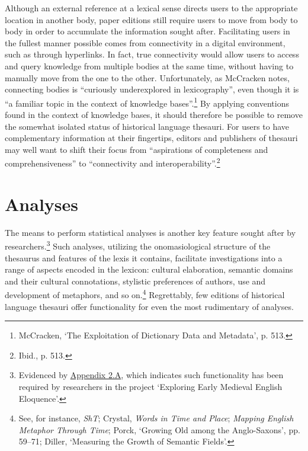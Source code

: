 Although an external reference at a lexical sense directs users to the appropriate location in another body, paper editions still require users to move from body to body in order to accumulate the information sought after. Facilitating users in the fullest manner possible comes from connectivity in a digital environment, such as through hyperlinks. In fact, true connectivity would allow users to access and query knowledge from multiple bodies at the same time, without having to manually move from the one to the other. Unfortunately, as McCracken notes, connecting bodies is ``curiously underexplored in lexicography'', even though it is ``a familiar topic in the context of knowledge bases''.\footnote{McCracken, `The Exploitation of Dictionary Data and Metadata', %
p. 513.} By applying conventions found in the context of knowledge bases, it should therefore be possible to remove the somewhat isolated status of historical language thesauri. For users to have complementary information at their fingertips, editors and publishers of thesauri may well want to shift their focus from ``aspirations of completeness and comprehensiveness'' to ``connectivity and interoperability''.\footnote{Ibid., p. 513.}



\section{Analyses}
\label{sect:Stolk_thes-functionality:analyses}

The means to perform statistical analyses is another key feature sought after by researchers.\footnote{Evidenced by \hyperref[Appendix2.A]{Appendix 2.A}, which indicates such functionality has been required by researchers in the project `Exploring Early Medieval English Eloquence'.} Such analyses, utilizing the onomasiological structure of the thesaurus and features of the lexis it contains, facilitate investigations into a range of aspects encoded in the lexicon: cultural elaboration, semantic domains and their cultural connotations, stylistic preferences of authors, use and development of metaphors, and so on.\footnote{See, for instance, \textit{ShT}; Crystal, \textit{Words in Time and Place}; \textit{Mapping English Metaphor Through Time}; Porck, `Growing Old among the Anglo-Saxons', pp. 59–71; Diller, `Measuring the Growth of Semantic Fields'.} Regrettably, few editions of historical language thesauri offer functionality for even the most rudimentary of analyses.

